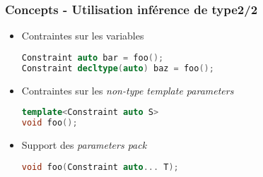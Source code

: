 \documentclass[C++.tex]{subfiles}
\begin{document}
\begin{frame}[fragile]
	\frametitle{Concepts - Utilisation inférence de type\titlehfill{}2/2}
	\begin{itemize}
		\item Contraintes sur les variables

		\begin{lstlisting}[language=C++]
Constraint auto bar = foo();
Constraint decltype(auto) baz = foo();\end{lstlisting}

		\item Contraintes sur les \textit{non-type template parameters}

		\begin{lstlisting}[language=C++]
template<Constraint auto S>
void foo();\end{lstlisting}

		\item Support des \textit{parameters pack}
	
		\begin{lstlisting}[language=C++]
void foo(Constraint auto... T);\end{lstlisting}
	\end{itemize}
\end{frame}
\end{document}
